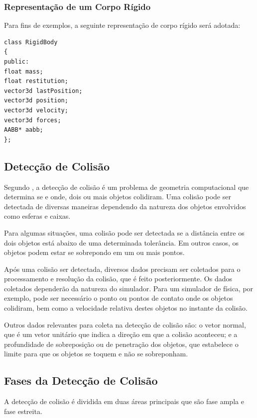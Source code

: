 \subsubsection{Representação de um Corpo Rígido}

Para fins de exemplos, a seguinte representação de corpo rígido será adotada:

\begin{lstlisting}[frame=single,caption=Exemplo de corpo rígido\label{code:RigidBody}]
class RigidBody
{
public:
float mass;
float restitution;
vector3d lastPosition;
vector3d position;
vector3d velocity;
vector3d forces;
AABB* aabb;
};
\end{lstlisting}

\subsection{Detecção de Colisão}
Segundo , a detecção de colisão é um problema de geometria computacional que
determina se e onde, dois ou mais objetos colidiram.
Uma colisão pode ser detectada de diversas maneiras dependendo da natureza dos
objetos envolvidos como esferas e caixas.

Para algumas situações, uma colisão pode ser detectada se a distância entre os dois objetos está abaixo de uma
determinada tolerância. Em outros casos, os objetos podem estar se sobrepondo
em um ou mais pontos.

Após uma colisão ser detectada, diversos dados precisam ser coletados para o processamento e resolução da colisão, que é feito posteriormente. Os dados coletados dependerão da natureza do simulador. Para um simulador de física, por exemplo, pode ser necessário o ponto ou pontos de contato onde os objetos colidiram, bem como a velocidade relativa destes objetos no instante da colisão.

Outros dados relevantes para coleta na detecção de colisão são: o vetor normal, que é um vetor unitário que indica a direção em que a colisão aconteceu; e  a profundidade de sobreposição ou de penetração dos objetos, que estabelece o limite para que os objetos se toquem e não se sobreponham.

\subsection{Fases da Detecção de Colisão}
A detecção de colisão é dividida em duas áreas principais que são fase ampla e fase estreita.

